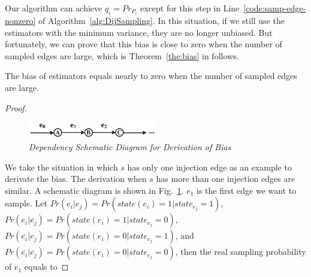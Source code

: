 \documentclass[runningheads,a4paper]{llncs}
\begin{document}
Our algorithm can achieve $q_i=Pr_{P_i}$ except for this step in Line~\ref{code:samp-edge-nonzero} of Algorithm~\ref{alg:DijSampling}. In this situation, if we still use the estimators with the minimum variance,  they are no longer unbiased. But fortunately, we can prove that this bias is close to zero when the number of sampled edges are large, which is Theorem~\ref{the:bias} in follows.

\vspace{-0.2cm}
\begin{theorem}
\label{the:bias}
The bias of estimators equals nearly to zero when the number of sampled edges are large.
\end{theorem}

\begin{proof}
\label{pro:bias}

\vspace{-1cm}
\begin{figure}[htbp]
\centering
  \includegraphics[width=0.5\textwidth]{fig-bias.eps}
\vspace{-0.4cm}
  \caption{\small{\emph{Dependency Schematic Diagram for Derivation of Bias}}}
  \label{fig:bias}
\vspace{-0.6cm}
\end{figure}

We take the situation in which $s$ has only one injection edge as an example to derivate the bias. The derivation when $s$ has more than one injection edges are similar. A schematic diagram is shown in Fig.~\ref{fig:bias}. $e_1$ is the first edge we want to sample. Let $Pr(e_i|e_j)=Pr(state(e_i)=1|state_{e_j}=1)$, $Pr(e_i|\overline{e_j})=Pr(state(e_i)=1|state_{e_j}=0)$, $Pr(\overline{e_i}|e_j)=Pr(state(e_i)=0|state_{e_j}=1)$, and $Pr(\overline{e_i}|\overline{e_j})=Pr(state(e_i)=0|state_{e_j}=0)$, then the real sampling probability of $e_1$ equals to


\end{proof}
\end{document}
